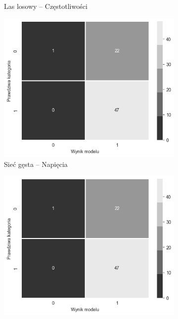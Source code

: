 \documentclass{./assets/wfis}
\begin{document}
\begin{figure}[h!]
\begin{subfigure}[b]{0.45\textwidth}
        \caption{Las losowy – Częstotliwości}
        \label{fig:psychoactive-substances}
    \end{subfigure}
    \begin{subfigure}[b]{0.45\textwidth}
        \centering
        \includegraphics[width=\columnwidth]{thesis/assets/confusion_matrix_placeholder.png}
        \caption{Sieć gęsta – Napięcia}
        \label{fig:computer-time}
    \end{subfigure}   
    \hfill
    \begin{subfigure}[b]{0.45\textwidth}
        \centering
        \includegraphics[width=\columnwidth]{thesis/assets/confusion_matrix_placeholder.png}

\end{subfigure}
\end{figure}
\end{document}
